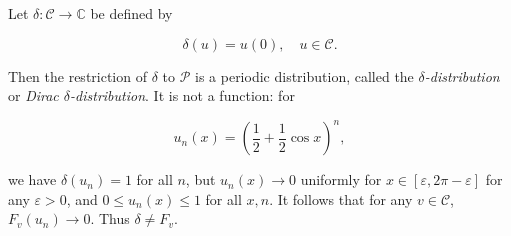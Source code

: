 Let $\delta: \mathcal{C} \to \mathbb{C}$ be defined by

$$\delta(u) = u(0), \quad u \in \mathcal{C}.$$

Then the restriction of $\delta$ to $\mathcal{P}$ is a periodic distribution, called the \textit{$\delta$-distribution} or \textit{Dirac $\delta$-distribution}. It is not a function: for

$$u_n(x) = \left(\frac{1}{2} + \frac{1}{2} \cos x\right)^n,$$

we have $\delta(u_n) = 1$ for all $n$, but $u_n(x) \to 0$ uniformly for $x \in [\varepsilon, 2\pi - \varepsilon]$ for any $\varepsilon > 0$, and $0 \leq u_n(x) \leq 1$ for all $x,n$. It follows that for any $v \in \mathcal{C}$, $F_v(u_n) \to 0$. Thus $\delta \neq F_v$.
